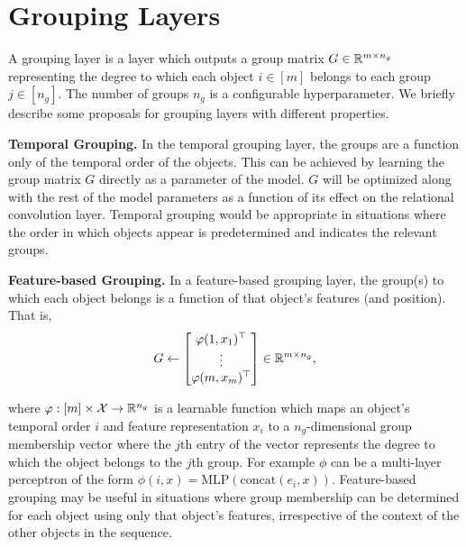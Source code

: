 \section{Grouping Layers}\label{sec:grouping_layers}

A grouping layer is a layer which outputs a group matrix $G \in \mathbb{R}^{m \times n_g}$ representing the degree to which each object $i \in [m]$ belongs to each group $j \in [n_g]$. The number of groups $n_g$ is a configurable hyperparameter. We briefly describe some proposals for grouping layers with different properties.

\textbf{Temporal Grouping.} In the temporal grouping layer, the groups are a function only of the temporal order of the objects. This can be achieved by learning the group matrix $G$ directly as a parameter of the model. $G$ will be optimized along with the rest of the model parameters as a function of its effect on the relational convolution layer. Temporal grouping would be appropriate in situations where the order in which objects appear is predetermined and indicates the relevant groups.

\textbf{Feature-based Grouping.} In a feature-based grouping layer, the group(s) to which each object belongs is a function of that object's features (and position). That is,
\begin{equation}
        G \gets \begin{bmatrix}
            \phi(1, x_1)^\top \\
            \vdots \\
            \phi(m, x_m)^\top
        \end{bmatrix} \in \reals^{m \times n_g},
\end{equation}

\noindent where $\varphi: [m] \times {\mathcal{X}} \to \mathbb{R}^{n_g}$ is a learnable function which maps an object's temporal order $i$ and feature representation $x_i$ to a $n_g$-dimensional group membership vector where the $j$th entry of the vector represents the degree to which the object belongs to the $j$th group. For example $\phi$ can be a multi-layer perceptron of the form $\phi(i, x) = \mathrm{MLP}(\mathrm{concat}(e_i, x))$. Feature-based grouping may be useful in situations where group membership can be determined for each object using only that object's features, irrespective of the context of the other objects in the sequence.

